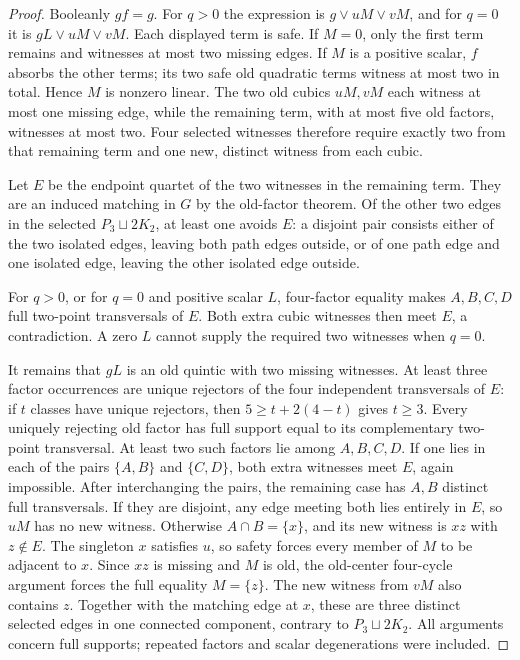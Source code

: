 \documentclass[11pt]{article}
\theoremstyle{definition}
\theoremstyle{remark}
\begin{document}
\begin{proof}
Booleanly $gf=g$. For $q>0$ the expression is $g\vee uM\vee vM$, and for $q=0$ it is $gL\vee uM\vee vM$. Each displayed term is safe. If $M=0$, only the first term remains and witnesses at most two missing edges. If $M$ is a positive scalar, $f$ absorbs the other terms; its two safe old quadratic terms witness at most two in total. Hence $M$ is nonzero linear. The two old cubics $uM,vM$ each witness at most one missing edge, while the remaining term, with at most five old factors, witnesses at most two. Four selected witnesses therefore require exactly two from that remaining term and one new, distinct witness from each cubic.

Let $E$ be the endpoint quartet of the two witnesses in the remaining term. They are an induced matching in $G$ by the old-factor theorem. Of the other two edges in the selected $P_3\sqcup2K_2$, at least one avoids $E$: a disjoint pair consists either of the two isolated edges, leaving both path edges outside, or of one path edge and one isolated edge, leaving the other isolated edge outside.

For $q>0$, or for $q=0$ and positive scalar $L$, four-factor equality makes $A,B,C,D$ full two-point transversals of $E$. Both extra cubic witnesses then meet $E$, a contradiction. A zero $L$ cannot supply the required two witnesses when $q=0$.

It remains that $gL$ is an old quintic with two missing witnesses. At least three factor occurrences are unique rejectors of the four independent transversals of $E$: if $t$ classes have unique rejectors, then $5\ge t+2(4-t)$ gives $t\ge3$. Every uniquely rejecting old factor has full support equal to its complementary two-point transversal. At least two such factors lie among $A,B,C,D$. If one lies in each of the pairs $\{A,B\}$ and $\{C,D\}$, both extra witnesses meet $E$, again impossible. After interchanging the pairs, the remaining case has $A,B$ distinct full transversals. If they are disjoint, any edge meeting both lies entirely in $E$, so $uM$ has no new witness. Otherwise $A\cap B=\{x\}$, and its new witness is $xz$ with $z\notin E$. The singleton $x$ satisfies $u$, so safety forces every member of $M$ to be adjacent to $x$. Since $xz$ is missing and $M$ is old, the old-center four-cycle argument forces the full equality $M=\{z\}$. The new witness from $vM$ also contains $z$. Together with the matching edge at $x$, these are three distinct selected edges in one connected component, contrary to $P_3\sqcup2K_2$. All arguments concern full supports; repeated factors and scalar degenerations were included.
\end{proof}
\end{document}
